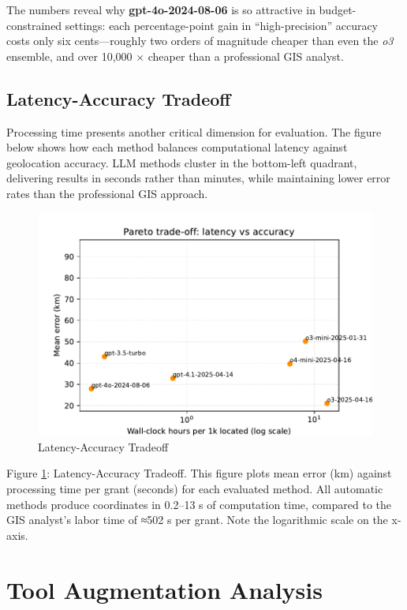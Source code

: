 The numbers reveal why \textbf{gpt-4o-2024-08-06} is so attractive in
budget-constrained settings: each percentage-point gain in
``high-precision'' accuracy costs only six cents---roughly two orders of
magnitude cheaper than even the \emph{o3} ensemble, and over 10,000 ×
cheaper than a professional GIS analyst.

\subsection{Latency-Accuracy
Tradeoff}\label{c.4-latency-accuracy-tradeoff}

Processing time presents another critical dimension for evaluation. The
figure below shows how each method balances computational latency
against geolocation accuracy. LLM methods cluster in the bottom-left
quadrant, delivering results in seconds rather than minutes, while
maintaining lower error rates than the professional GIS approach.

\begin{figure}
\centering
\includegraphics[width=\textwidth,height=0.8\textheight,keepaspectratio]{figures/pareto_latency_tradeoff.pdf}
\caption{Latency-Accuracy Tradeoff}\label{fig:pareto_latency}
\end{figure}

Figure \ref{fig:pareto_latency}: Latency-Accuracy Tradeoff. This figure
plots mean error (km) against processing time per grant (seconds) for
each evaluated method. All automatic methods produce coordinates in
0.2--13 s of computation time, compared to the GIS analyst's labor time
of ≈502 s per grant. Note the logarithmic scale on the x-axis.

\section{Tool Augmentation
Analysis}\label{appendix-d-tool-augmentation-analysis}

